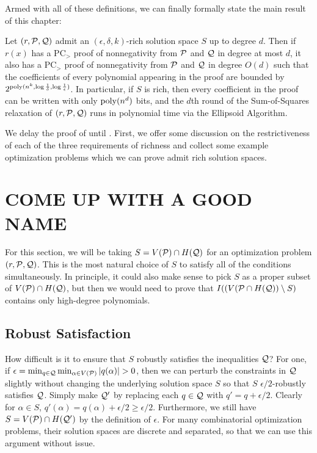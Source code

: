 Armed with all of these definitions, we can finally formally state the main result of this chapter:
\begin{theorem}\label{thm:bit_complexity-main}
Let $(r, \mathcal P, \mathcal Q)$ admit an $(\epsilon,\delta,k)$-rich solution space $S$ up to degree $d$. Then if $r(x)$ has a PC$_>$ proof of nonnegativity from $\mathcal P$ and $\mathcal Q$ in degree at most $d$, it also has a PC$_>$ proof of nonnegativity from $\mathcal P$ and $\mathcal Q$ in degree $O(d)$ such that the coefficients of every polynomial appearing in the proof are bounded by $2^{\operatorname{poly}(n^k, \log \frac{1}{\delta}, \log \frac{1}{\epsilon})}$. In particular, if $S$ is rich, then every coefficient in the proof can be written with only $\operatorname{poly}(n^d)$ bits, and the $d$th round of the Sum-of-Squares relaxation of $(r, \mathcal P, \mathcal Q)$ runs in polynomial time via the Ellipsoid Algorithm.
\end{theorem}

We delay the proof of  until . First, we offer some discussion on the restrictiveness of each of the three requirements of richness and collect some example optimization problems which we can prove admit rich solution spaces.

\section{COME UP WITH A GOOD NAME}
For this section, we will be taking $S = V(\mathcal P) \cap H(\mathcal Q)$ for an optimization problem $(r,\mathcal P,\mathcal Q)$. This is the most natural choice of $S$ to satisfy all of the conditions simultaneously. In principle, it could also make sense to pick $S$ as a proper subset of $V(\mathcal P) \cap H(\mathcal Q)$, but then we would need to prove that $I((V(\mathcal P \cap H(\mathcal Q)) \setminus S)$ contains only high-degree polynomials. 
\subsection{Robust Satisfaction}
How difficult is it to ensure that $S$ robustly satisfies the inequalities $\mathcal Q$? For one, if $\epsilon = \min_{q \in \mathcal Q} \min_{\alpha \in V(\mathcal P)} |q(\alpha)| > 0$, then we can perturb the constraints in $\mathcal Q$ slightly without changing the underlying solution space $S$ so that $S$ $\epsilon/2$-robustly satisfies $\mathcal Q$. Simply make $\mathcal Q'$ by replacing each $q \in \mathcal Q$ with $q' = q + \epsilon/2$. Clearly for $\alpha \in S$, $q'(\alpha) = q(\alpha) + \epsilon/2 \geq \epsilon/2$. Furthermore, we still have $S = V(\mathcal P) \cap H(\mathcal Q')$ by the definition of $\epsilon$. For many combinatorial optimization problems, their solution spaces are discrete and separated, so that we can use this argument without issue. 